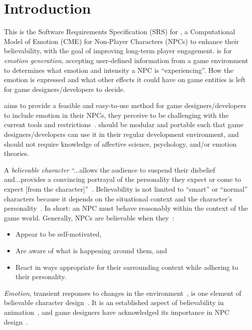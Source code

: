 \section{Introduction}
This is the Software Requirements Specification (SRS) for \progname{}, a 
Computational Model of Emotion (CME) for Non-Player Characters (NPCs) to 
enhance their believability, with the goal of improving long-term player 
engagement. \progname{} is for \textit{emotion generation}, accepting 
user-defined information from a game environment to determines what emotion and 
intensity a NPC is ``experiencing''. How the emotion is expressed and what 
other effects it could have on game entities is left for game 
designers/developers to decide.

\progname{} aims to provide a feasible and easy-to-use method for game 
designers/developers to include emotion in their NPCs, they perceive to be 
challenging with the current tools and 
restrictions~\citep{broekens2016emotional}. \progname{} should be modular and 
portable such that game designers/developers can use it in their regular 
development environment, and should not require knowledge of affective science, 
psychology, and/or emotion theories.

A \textit{believable character} ``...allows the audience to suspend their 
disbelief and...provides a convincing portrayal of the personality they expect
or come to expect [from the character]''~\cite[p.~1]{loyall1997believable}. 
Believability is not limited to ``smart'' or ``normal'' characters because it
depends on the situational context and the character's
personality~\citep{lisetti2015and, loyall1997believable, reilly1996believable}.
In short: an NPC must behave reasonably within the context of the game world.
Generally, NPCs are believable when they~\citep{lankoski2007gameplay,
    loyall1997believable, warpefelt2013analyzing}:
\begin{itemize}
    \item Appear to be self-motivated,
    
    \item Are aware of what is happening around them, and
    
    \item React in ways appropriate for their surrounding context while
    adhering to their personality.
\end{itemize}

\textit{Emotion}, transient responses to changes in the 
environment~\citep{lazarus1991emotion}, is one element of believable character 
design~\citep{de2015beyond, emmerich2018m, gard2000building, 
lankoski2007gameplay, lisetti2015and, loyall1997believable, paiva2005learning, 
warpefelt2013analyzing}. It is an established aspect of believability in 
animation~\citep{thomas1981illusion}, and game designers have acknowledged its 
importance in NPC design~\citep{hudlicka2009foundations, yannakakis2015emotion}.

